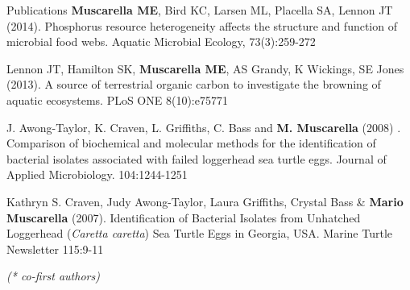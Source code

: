 \documentclass{resume} %
\begin{document}
\begin{rSection}{Publications}
{\bf Muscarella ME}, Bird KC, Larsen ML, Placella SA, Lennon JT (2014).
Phosphorus resource heterogeneity affects the structure and function of
microbial food webs. Aquatic Microbial Ecology, 73(3):259-272

Lennon JT, Hamilton SK, {\bf Muscarella ME}, AS Grandy, K Wickings, SE Jones
(2013). A source of terrestrial organic carbon to investigate the browning of
aquatic ecosystems. PLoS ONE 8(10):e75771

J. Awong-Taylor, K. Craven, L. Griffiths, C. Bass and {\bf M. Muscarella} (2008)
. Comparison of biochemical and molecular methods for the identification of
bacterial isolates associated with failed loggerhead sea turtle eggs. Journal of
Applied Microbiology. 104:1244-1251

Kathryn S. Craven, Judy Awong-Taylor, Laura Griffiths, Crystal Bass \&
{\bf Mario Muscarella} (2007). Identification of Bacterial Isolates from
Unhatched Loggerhead ({\em Caretta caretta}) Sea Turtle Eggs in Georgia, USA.
Marine Turtle Newsletter 115:9-11

{\em (* co-first authors)}

\end{rSection}

\end{document}
